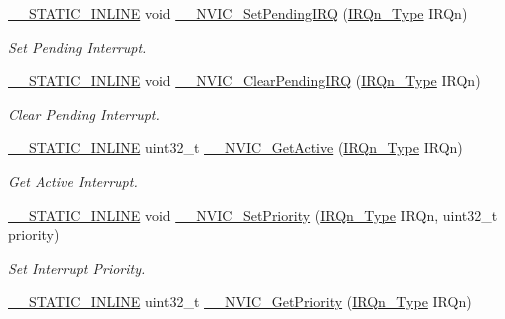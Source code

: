 \begin{DoxyCompactItemize}
\hyperlink{cmsis__iccarm_8h_aba87361bfad2ae52cfe2f40c1a1dbf9c}{\+\_\+\+\_\+\+S\+T\+A\+T\+I\+C\+\_\+\+I\+N\+L\+I\+NE} void \hyperlink{group___c_m_s_i_s___core___n_v_i_c_functions_gaabefdd4b790b9a7308929938c0c1e1ad}{\+\_\+\+\_\+\+N\+V\+I\+C\+\_\+\+Set\+Pending\+I\+RQ} (\hyperlink{group___c_m_s_i_s__18_x_x___i_r_q_gaa44deabd252bda567898bae35a086adc}{I\+R\+Qn\+\_\+\+Type} I\+R\+Qn)
\begin{DoxyCompactList}\small\item\em Set Pending Interrupt. \end{DoxyCompactList}\item 
\hyperlink{cmsis__iccarm_8h_aba87361bfad2ae52cfe2f40c1a1dbf9c}{\+\_\+\+\_\+\+S\+T\+A\+T\+I\+C\+\_\+\+I\+N\+L\+I\+NE} void \hyperlink{group___c_m_s_i_s___core___n_v_i_c_functions_ga562a86dbdf14827d0fee8fdafb04d191}{\+\_\+\+\_\+\+N\+V\+I\+C\+\_\+\+Clear\+Pending\+I\+RQ} (\hyperlink{group___c_m_s_i_s__18_x_x___i_r_q_gaa44deabd252bda567898bae35a086adc}{I\+R\+Qn\+\_\+\+Type} I\+R\+Qn)
\begin{DoxyCompactList}\small\item\em Clear Pending Interrupt. \end{DoxyCompactList}\item 
\hyperlink{cmsis__iccarm_8h_aba87361bfad2ae52cfe2f40c1a1dbf9c}{\+\_\+\+\_\+\+S\+T\+A\+T\+I\+C\+\_\+\+I\+N\+L\+I\+NE} uint32\+\_\+t \hyperlink{group___c_m_s_i_s___core___n_v_i_c_functions_gaa2837003c28c45abf193fe5e8d27f593}{\+\_\+\+\_\+\+N\+V\+I\+C\+\_\+\+Get\+Active} (\hyperlink{group___c_m_s_i_s__18_x_x___i_r_q_gaa44deabd252bda567898bae35a086adc}{I\+R\+Qn\+\_\+\+Type} I\+R\+Qn)
\begin{DoxyCompactList}\small\item\em Get Active Interrupt. \end{DoxyCompactList}\item 
\hyperlink{cmsis__iccarm_8h_aba87361bfad2ae52cfe2f40c1a1dbf9c}{\+\_\+\+\_\+\+S\+T\+A\+T\+I\+C\+\_\+\+I\+N\+L\+I\+NE} void \hyperlink{group___c_m_s_i_s___core___n_v_i_c_functions_ga505338e23563a9c074910fb14e7d45fd}{\+\_\+\+\_\+\+N\+V\+I\+C\+\_\+\+Set\+Priority} (\hyperlink{group___c_m_s_i_s__18_x_x___i_r_q_gaa44deabd252bda567898bae35a086adc}{I\+R\+Qn\+\_\+\+Type} I\+R\+Qn, uint32\+\_\+t priority)
\begin{DoxyCompactList}\small\item\em Set Interrupt Priority. \end{DoxyCompactList}\item 
\hyperlink{cmsis__iccarm_8h_aba87361bfad2ae52cfe2f40c1a1dbf9c}{\+\_\+\+\_\+\+S\+T\+A\+T\+I\+C\+\_\+\+I\+N\+L\+I\+NE} uint32\+\_\+t \hyperlink{group___c_m_s_i_s___core___n_v_i_c_functions_gaeb9dc99c8e7700668813144261b0bc73}{\+\_\+\+\_\+\+N\+V\+I\+C\+\_\+\+Get\+Priority} (\hyperlink{group___c_m_s_i_s__18_x_x___i_r_q_gaa44deabd252bda567898bae35a086adc}{I\+R\+Qn\+\_\+\+Type} I\+R\+Qn)

\end{DoxyCompactItemize}
